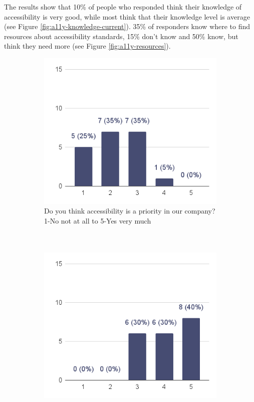 \documentclass{master_thesis}
\begin{document}
The results show that 10\% of people who responded think their knowledge of accessibility is very good, while most think that their knowledge level is average (see Figure \ref{fig:a11y-knowledge-current}). 35\% of responders know where to find resources about accessibility standards, 15\% don't know and 50\% know, but think they need more (see Figure \ref{fig:a11y-resources}).

\begin{figure}[H]
    \centering
	\begin{subfigure}{0.45\textwidth}
		\includegraphics[width=\textwidth]{img/a11y-priority.png}
		\caption{Do you think accessibility is a priority in our company? 1-No not at all to 5-Yes very much \\
		\\
		\\}
	\end{subfigure}
	\hspace{0.05\textwidth}
	\begin{subfigure}{0.45\textwidth}
		\includegraphics[width=\textwidth]{img/a11y-goals.png}

\end{subfigure}
\end{figure}
\end{document}
